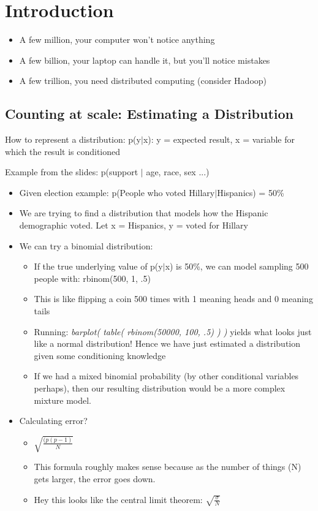 
\section{Introduction}
\begin{itemize}
    \item A few million, your computer won’t notice anything
    \item A few billion, your laptop can handle it, but you’ll notice mistakes
    \item A few trillion, you need distributed computing (consider Hadoop)
\end{itemize}

\subsection{Counting at scale: Estimating a Distribution}

\noindent How to represent a distribution: p(y$|$x): y = expected result, x = variable for which the result is conditioned

\noindent Example from the slides: p(support $|$ age, race, sex ...)

\begin{itemize}
    \item Given election example: p(People who voted Hillary$|$Hispanics) = 50\%
    \item We are trying to find a  distribution that models how the Hispanic demographic voted. Let x = Hispanics, y = voted for Hillary
    \item We can try a binomial distribution:
    \begin{itemize}
        \item If the true underlying value of p(y$|$x) is 50\%, we can model sampling 500 people with: rbinom(500, 1, .5)
        \item This is like flipping a coin 500 times with 1 meaning heads and 0 meaning tails
        \item Running: \textit{barplot( table( rbinom(50000, 100, .5) ) )} yields what looks just like a normal distribution! Hence we have just estimated a distribution given some conditioning knowledge
        \item If we had a mixed binomial probability (by other conditional variables perhaps), then our resulting distribution would be a more complex mixture model.
    \end{itemize}
    \item Calculating error?
    \begin{itemize}
    	\item $\sqrt{ \frac{(p(p-1)}{N} }$
        \item This formula roughly makes sense because as the number of things (N) gets larger, the error goes down.
        \item Hey this looks like the central limit theorem: $\sqrt{ \frac{\sigma}{N} }$
    \end{itemize}
\end{itemize}

